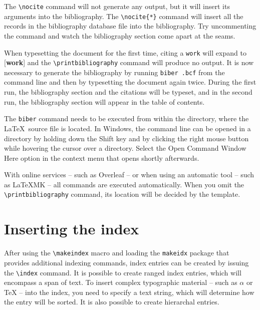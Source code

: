 \documentclass[
  digital,     %
  oneside,     %
  nosansbold,  %
  nocolorbold, %
  lof,         %
  lot,         %
]{fithesis4}
\begin{document}
The \verb"\nocite" command will not generate any
output\nocite{muni}, but it will insert its arguments into
the bibliography. The \verb"\nocite{*}" command will insert all the
records in the bibliography database file into the bibliography.
Try uncommenting the command
and watch the bibliography section come apart at the seams.

When typesetting the document for the first time, citing a
\texttt{work} will expand to [\textbf{work}] and the
\verb"\printbibliography" command will produce no output. It is now
necessary to generate the bibliography by running \texttt{biber
\jobname.bcf} from the command line and then by typesetting the
document again twice. During the first run, the bibliography
section and the citations will be typeset, and in the second run,
the bibliography section will appear in the table of contents.

The \texttt{biber} command needs to be executed from within the
directory, where the \LaTeX\ source file is located. In Windows,
the command line can be opened in a directory by holding down the
\textsf{Shift} key and by clicking the right mouse button while
hovering the cursor over a directory.  Select the \textsf{Open
Command Window Here} option in the context menu that opens shortly
afterwards.

With online services -- such as Overleaf -- or when using an
automatic tool -- such as \LaTeX MK -- all commands are executed
automatically. When you omit the \verb"\printbibliography" command,
its location will be decided by the template.

  \printbibliography[heading=bibintoc] %

\chapter{Inserting the index}
After using the \verb"\makeindex" macro and loading the
\texttt{makeidx} package that provides additional indexing
commands, index entries can be created by issuing the \verb"\index"
command. It is possible to create ranged index
entries, which will encompass a span of text.
To insert complex typographic material -- such as $\alpha$
 or \TeX{}  --
into the index, you need to specify a text string, which will
determine how the entry will be sorted. It is also possible to
create hierarchal entries. 
\end{document}
